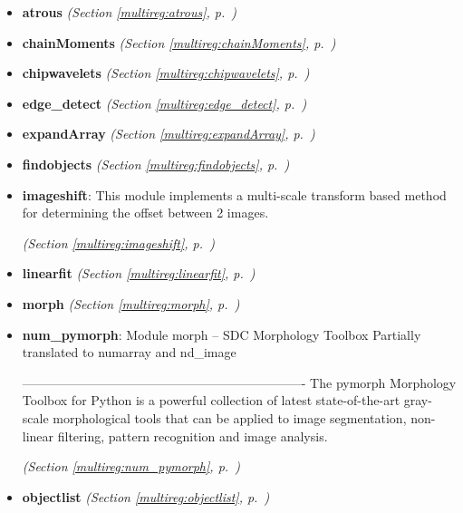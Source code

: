 \begin{itemize}
\setlength{\parskip}{0ex}
\item \textbf{atrous}
  \textit{(Section \ref{multireg:atrous}, p.~\pageref{multireg:atrous})}

\item \textbf{chainMoments}
  \textit{(Section \ref{multireg:chainMoments}, p.~\pageref{multireg:chainMoments})}

\item \textbf{chipwavelets}
  \textit{(Section \ref{multireg:chipwavelets}, p.~\pageref{multireg:chipwavelets})}

\item \textbf{edge\_detect}
  \textit{(Section \ref{multireg:edge_detect}, p.~\pageref{multireg:edge_detect})}

\item \textbf{expandArray}
  \textit{(Section \ref{multireg:expandArray}, p.~\pageref{multireg:expandArray})}

\item \textbf{findobjects}
  \textit{(Section \ref{multireg:findobjects}, p.~\pageref{multireg:findobjects})}

\item \textbf{imageshift}: This module implements a multi-scale transform based method for 
determining the offset between 2 images.

  \textit{(Section \ref{multireg:imageshift}, p.~\pageref{multireg:imageshift})}

\item \textbf{linearfit}
  \textit{(Section \ref{multireg:linearfit}, p.~\pageref{multireg:linearfit})}

\item \textbf{morph}
  \textit{(Section \ref{multireg:morph}, p.~\pageref{multireg:morph})}

\item \textbf{num\_pymorph}: Module morph -- SDC Morphology Toolbox 
    Partially translated to numarray and nd\_image 
    
-------------------------------------------------------------------
The pymorph Morphology Toolbox for Python is a powerful collection of latest
state-of-the-art gray-scale morphological tools that can be applied to image
segmentation, non-linear filtering, pattern recognition and image analysis.

  \textit{(Section \ref{multireg:num_pymorph}, p.~\pageref{multireg:num_pymorph})}

\item \textbf{objectlist}
  \textit{(Section \ref{multireg:objectlist}, p.~\pageref{multireg:objectlist})}

\end{itemize}

